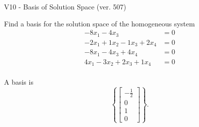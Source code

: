 \begin{exercise}
  \begin{exerciseTitle}V10 - Basis of Solution Space (ver. 507)\end{exerciseTitle}
  \begin{exerciseStatement}
    Find a basis for the solution space of the homogeneous system 
\begin{align*}
 -8 x_ 1 -4 x_ 3 &= 0  \\ 
  -2 x_ 1 + 1 x_ 2 -1 x_ 3 + 2 x_ 4 &= 0  \\ 
  -8 x_ 1 -4 x_ 3 + 4 x_ 4 &= 0  \\ 
  4 x_ 1 -3 x_ 2 + 2 x_ 3 + 1 x_ 4 &= 0  \\ 
 \end{align*}


 
  \end{exerciseStatement}

  \begin{exerciseAnswer}
   A basis is   
\[\left\{\left[\begin{array}{c}
-\frac{1}{2} \\
0 \\
1 \\
0
\end{array}\right]\right\}.\]

  


  \end{exerciseAnswer}
\end{exercise}